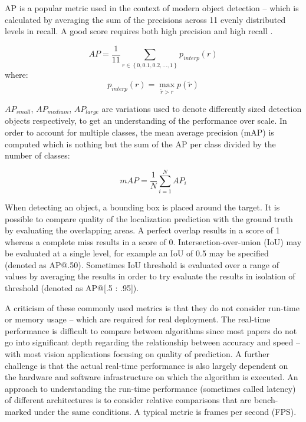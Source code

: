 \documentclass[a4paper,twoside,12pt]{report}
\begin{document}
AP is a popular metric used in the context of modern object detection -- which is calculated by averaging the sum of the precisions across 11 evenly distributed levels in recall. A good score requires both high precision and high recall \citep{vocdataset}.

\begin{equation}
AP = \frac{1}{11}\sum_{r\in\left\{0,0.1,0.2,...,1\right\}}^{} p_{interp}(r)
\end{equation}
where:
\begin{equation}
p_{interp}(r) =\max_{\widetilde{r} > r} p(\widetilde{r})
\end{equation}

$AP_{small}$, $AP_{medium}$, $AP_{large}$ are variations used to denote differently sized detection objects respectively, to get an understanding of the performance over scale. In order to account for multiple classes, the mean average precision (mAP) is computed which is nothing but the sum of the AP per class divided by the number of classes:

\begin{equation}
mAP = \frac{1}{N}\sum_{i=1}^{N} AP_{i}
\end{equation}

When detecting an object, a bounding box is placed around the target. It is possible to compare quality of the localization prediction with the ground truth by evaluating the overlapping areas. A perfect overlap results in a score of 1 whereas a complete miss results in a score of 0. Intersection-over-union (IoU) may be evaluated at a single level, for example an IoU of 0.5 may be specified (denoted as AP@.50). Sometimes IoU threshold is evaluated over a range of values by averaging the results in order to try evaluate the results in isolation of threshold (denoted as AP@[.5 : .95]).  \citep{pmetrics}

A criticism of these commonly used metrics is that they do not consider run-time or memory usage -- which are required for real deployment. The real-time performance is difficult to compare between algorithms since most papers do not go into significant depth regarding the relationship between accuracy and speed \citep{speedacc} -- with most vision applications focusing on quality of prediction. A further challenge is that the actual real-time performance is also largely dependent on the hardware and software infrastructure on which the algorithm is executed. An approach to understanding the run-time performance (sometimes called latency) of different architectures is to consider relative comparisons that are bench-marked under the same conditions. A typical metric is frames per second (FPS).
\end{document}
